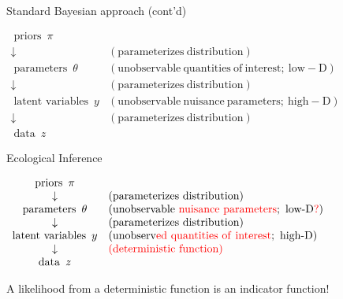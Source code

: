\documentclass[ignorenonframetext,]{beamer}
\newcommand{\red}[1]{\textcolor{red}{#1}}
\begin{document}
\begin{frame}{Standard Bayesian approach (cont'd)}

\(\begin{array}{cl} \operatorname{priors}~\pi & \\ \downarrow & \operatorname{(parameterizes~distribution)}\\ \operatorname{parameters}~\theta & \operatorname{(unobservable~quantities~of~interest;~low-D)}\\ \downarrow & \operatorname{(parameterizes~distribution)}\\ \operatorname{latent~variables}~y & \operatorname{(unobservable~nuisance~parameters;~high-D)}\\ \downarrow & \operatorname{(parameterizes~distribution)}\\ \operatorname{data}~z & \end{array}\)

\end{frame}

\begin{frame}{Ecological Inference}

\(\begin{array}{cl} \operatorname{priors}~\pi & \\ \downarrow & \operatorname{(parameterizes~distribution)}\\ \operatorname{parameters}~\theta & \operatorname{(unobservable~\red{nuisance~parameters};~low-D\red{?})}\\ \downarrow & \operatorname{(parameterizes~distribution)}\\ \operatorname{latent~variables}~y & \operatorname{(unobserv\red{ed~quantities~of~interest};~high-D)}\\ \downarrow & \operatorname{\red{(deterministic~function)}}\\ \operatorname{data}~z & \end{array}\)

A likelihood from a deterministic function is an indicator function!

\end{frame}
\end{document}
